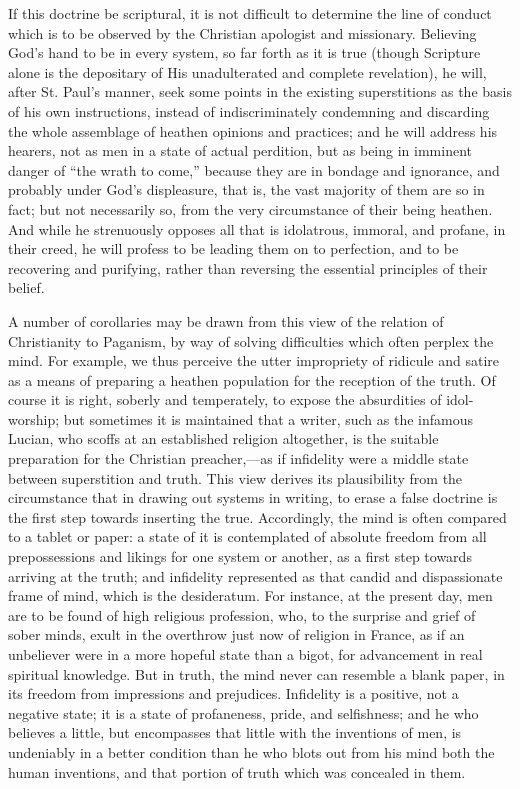 If this doctrine be scriptural, it is not difficult to determine
the line of conduct which is to be observed by the Christian apologist
and missionary. Believing God's hand to be in every system, so far
forth as it is true (though Scripture alone is the depositary of His
unadulterated and complete revelation), he will, after St. Paul's
manner, seek some points in the existing superstitions as the basis of
his own instructions, instead of indiscriminately condemning and
discarding the whole assemblage of heathen opinions and practices; and
he will address his hearers, not as men in a state of actual
perdition, but as being in imminent danger of ``the wrath to
come,'' because they are in bondage and ignorance, and probably
under God's displeasure, that is, the vast majority of them are so in
fact; but not necessarily so, from the very circumstance of their
being heathen. And while he strenuously opposes all that is
idolatrous, immoral, and profane, in their creed, he will profess to
be leading them on to perfection, and to be recovering and purifying,
rather than reversing the essential principles of their belief.

A number of corollaries may be drawn from this view of the relation
of Christianity to Paganism, by way of solving difficulties which
often perplex the mind. For example, we thus perceive the utter
impropriety of ridicule and satire as a means of preparing a heathen
population for the reception of the truth. Of course it is right,
soberly and temperately, to expose the absurdities of idol-worship;
but sometimes it is maintained that a writer, such as the infamous
Lucian, who scoffs at an established religion altogether, is the
suitable preparation for the Christian preacher,—as if infidelity
were a middle state between superstition and truth. This view derives
its plausibility from the circumstance that in drawing out systems in
writing, to erase a false doctrine is the first step towards inserting
the true. Accordingly, the mind is often compared to a tablet or
paper: a state of it is contemplated of absolute freedom from all
prepossessions and likings for one system or another, as a first step
towards arriving at the truth; and infidelity represented as that
candid and dispassionate frame of mind, which is the desideratum. For
instance, at the present day, men are to be found of high religious
profession, who, to the surprise and grief of sober minds, exult in
the overthrow just now of religion in France, as if an unbeliever were
in a more hopeful state than a bigot, for advancement in real
spiritual knowledge. But in truth, the mind never can resemble a blank
paper, in its freedom from impressions and prejudices. Infidelity is a
positive, not a negative state; it is a state of profaneness, pride,
and selfishness; and he who believes a little, but encompasses that
little with the inventions of men, is undeniably in a better condition
than he who blots out from his mind both the human inventions, and
that portion of truth which was concealed in them.

